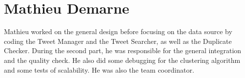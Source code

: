 \section{Mathieu Demarne}

Mathieu worked on the general design before focusing on the data source by coding the Tweet Manager and the Tweet Searcher, as well as the Duplicate Checker. During the second part, he was responsible for the general integration and the quality check. He also did some debugging for the clustering algorithm and some tests of scalability. He was also the team coordinator.